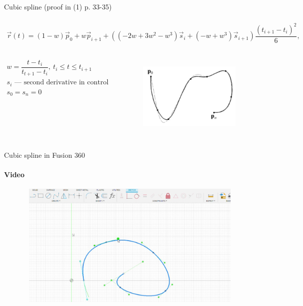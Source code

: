 \documentclass[aspectratio=169]{beamer}
\begin{document}
\begin{frame}[t]{Cubic spline (proof in (1) p. 33-35)}
\framesubtitle{}
\begin{align*}
    \vec{r}(t) = (1-w)\vec{p}_0 + w\vec{p}_{i+1} + \left((-2w+3w^2-w^3)\vec{s}_i+(-w+w^3)\vec{s}_{i+1}\right)\dfrac{(t_{i+1}-t_i)^2}{6},
\end{align*}
    \begin{columns}[T,onlytextwidth]
        \begin{column}{0.49\textwidth}
            \begin{align*}
                w=\dfrac{t-t_i}{t_{t+1}-t_i},\ t_i \leq t \leq t_{i+1} \\
                s_i \text{ --- second derivative in control points} \\ 
                s_0 = s_n = 0
            \end{align*}
        \end{column}
        \begin{column}{0.49\textwidth}
            \vspace{-0.3cm}
            \begin{figure}[H]
                \centering\includegraphics[height=4cm,width=1\textwidth,keepaspectratio]{cubic_spline_book.png}
                \label{fig:cubic_spline_book.png}
            \end{figure} 
        \end{column}
    \end{columns}
\end{frame}

\begin{frame}[t]{Cubic spline in Fusion 360}
    \framesubtitle{Video}
    \vspace{-0.6cm}
    \begin{figure}[H]
        \href{run:./videos/cubic_spline_video.mp4}{
            \centering\includegraphics[height=6cm,width=1\textwidth,keepaspectratio]{cubic_spline_video_preview.jpg}}
    \end{figure}
\end{frame}
\end{document}
